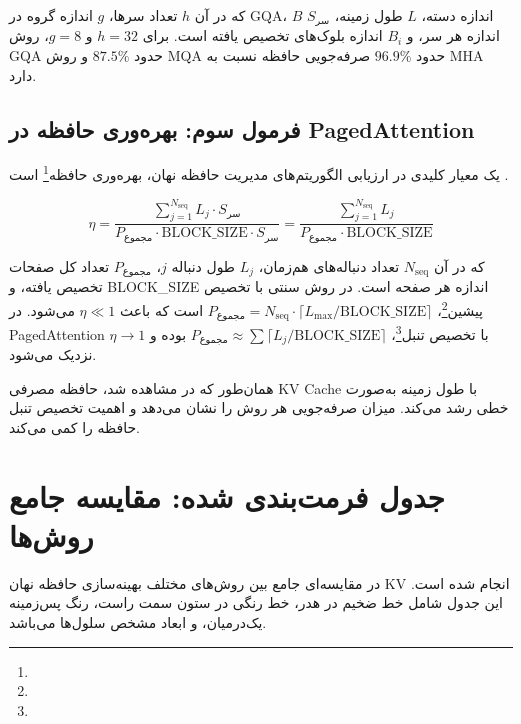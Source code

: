 که در آن $h$ تعداد سرها، $g$ اندازه گروه در GQA، $B$ اندازه دسته، $L$ طول زمینه، $S_{\text{سر}}$ اندازه هر سر، و $B_i$ اندازه بلوک‌های تخصیص یافته است. برای $h=32$ و $g=8$، روش GQA حدود $87.5\%$ و روش MQA حدود $96.9\%$ صرفه‌جویی حافظه نسبت به MHA دارد.

\subsection{فرمول سوم: بهره‌وری حافظه در PagedAttention}
یک معیار کلیدی در ارزیابی الگوریتم‌های مدیریت حافظه نهان، بهره‌وری حافظه\footnote{} است \cite{kwon2023efficient}.

\begin{equation}
\label{eq:utilization}
\eta = \frac{\sum_{j=1}^{N_{\text{seq}}} L_j \cdot S_{\text{سر}}}{P_{\text{مجموع}} \cdot \text{BLOCK\_SIZE} \cdot S_{\text{سر}}}
= \frac{\sum_{j=1}^{N_{\text{seq}}} L_j}{P_{\text{مجموع}} \cdot \text{BLOCK\_SIZE}}
\end{equation}

که در آن $N_{\text{seq}}$ تعداد دنباله‌های هم‌زمان، $L_j$ طول دنباله $j$، $P_{\text{مجموع}}$ تعداد کل صفحات تخصیص یافته، و BLOCK\_SIZE اندازه هر صفحه است. در روش سنتی با تخصیص پیشین\footnote{}، $P_{\text{مجموع}} = N_{\text{seq}} \cdot \lceil L_{\max} / \text{BLOCK\_SIZE} \rceil$ است که باعث $\eta \ll 1$ می‌شود. در PagedAttention با تخصیص تنبل\footnote{}، $P_{\text{مجموع}} \approx \sum \lceil L_j / \text{BLOCK\_SIZE} \rceil$ بوده و $\eta \to 1$ نزدیک می‌شود.

همان‌طور که در  مشاهده شد، حافظه مصرفی KV Cache با طول زمینه به‌صورت خطی رشد می‌کند.  میزان صرفه‌جویی هر روش را نشان می‌دهد و  اهمیت تخصیص تنبل حافظه را کمی می‌کند.

\section{جدول فرمت‌بندی شده: مقایسه جامع روش‌ها}
در  مقایسه‌ای جامع بین روش‌های مختلف بهینه‌سازی حافظه نهان KV انجام شده است. این جدول شامل خط ضخیم در هدر، خط رنگی در ستون سمت راست، رنگ پس‌زمینه یک‌درمیان، و ابعاد مشخص سلول‌ها می‌باشد.

